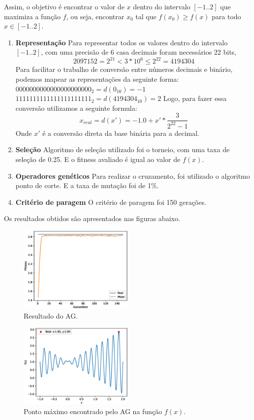 \documentclass[12pt]{article}
\begin{document}
Assim, o objetivo é encontrar o valor de $x$ dentro do intervalo $[-1..2]$ que maximiza a função
$f$, ou seja, encontrar $x_0$ tal que $f(x_0) \geq f(x) $ para todo $x \in [-1..2]$.

\begin{enumerate}[\textbf{(i)}]
	\item \textbf{Representação}
		\subitem Para representar todos os valores dentro do intervalo $[-1..2]$, com uma precisão
		de 6 casa decimais foram necessários 22 bits,
		$$2097152 = 2^{21} < 3*10^6 \leq 2^{22} = 4194304$$
		\subitem Para facilitar o trabalho de conversão entre números decimais e binário, podemos
		mapear as representações da seguinte forma:
			\subsubitem $0000000000000000000000_2 = d(0_{10}) = -1$
			\subsubitem $1111111111111111111111_2 = d(4194304_{10}) = 2$
		\subitem Logo, para fazer essa conversão utilizamos a seguinte formula:
		$$x_{real} = d(x') =  -1.0 + x' * \frac{3}{2^{22} - 1}$$
		\subitem Onde $x'$ é a conversão direta da base binária para a decimal.

	\item \textbf{Seleção}
		\subitem Algoritmo de seleção utilizado foi o torneio, com uma taxa de seleção de 0.25. E o fitness
		avaliado é igual ao valor de $f(x)$.
	\item \textbf{Operadores genéticos}
		\subitem Para realizar o cruzamento, foi utilizado o algoritmo ponto de corte. E a taxa de
		mutação foi de 1\%.
	\item \textbf{Critério de paragem}
		\subitem O critério de paragem foi 150 gerações.
\end{enumerate}

Os resultados obtidos são apresentados nas figuras abaixo.

\begin{figure}[htb]
	\begin{center}
	\includegraphics[width=0.5\textwidth]{./imgs/result-ag.eps}
	\caption{Resultado do AG.\label{fig:result}}
	\end{center}
\end{figure}

\begin{figure}[htb]
	\begin{center}
	\includegraphics[width=0.5\textwidth]{./imgs/result2-ag.eps}
	\caption{Ponto máximo encontrado pelo AG na função $f(x)$.\label{fig:result}}
	\end{center}
\end{figure}
\end{document}

